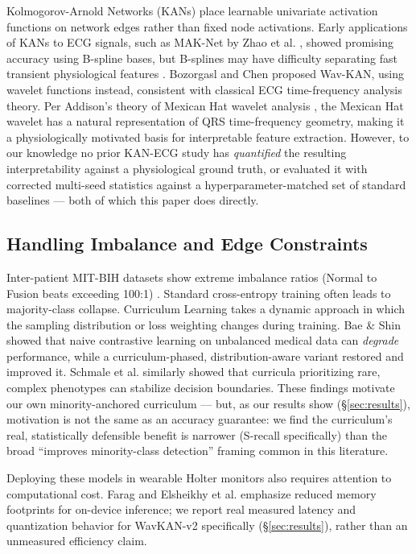 \documentclass[journal,twoside,web]{ieeecolor}
\begin{document}
Kolmogorov-Arnold Networks (KANs) \cite{liu_kan_2024} place learnable univariate activation functions on network edges rather than fixed node activations. Early applications of KANs to ECG signals, such as MAK-Net by Zhao et al. \cite{zhao_mak-net_2025}, showed promising accuracy using B-spline bases, but B-splines may have difficulty separating fast transient physiological features \cite{bozorgasl_liu_2024}. Bozorgasl and Chen \cite{bozorgasl_liu_2024} proposed Wav-KAN, using wavelet functions instead, consistent with classical ECG time-frequency analysis theory. Per Addison's theory of Mexican Hat wavelet analysis \cite{addison_wavelet_2005}, the Mexican Hat wavelet has a natural representation of QRS time-frequency geometry, making it a physiologically motivated basis for interpretable feature extraction. However, to our knowledge no prior KAN-ECG study has \emph{quantified} the resulting interpretability against a physiological ground truth, or evaluated it with corrected multi-seed statistics against a hyperparameter-matched set of standard baselines --- both of which this paper does directly.

\subsection{Handling Imbalance and Edge Constraints}
Inter-patient MIT-BIH datasets show extreme imbalance ratios (Normal to Fusion beats exceeding 100:1) \cite{silva_systematic_2025}. Standard cross-entropy training often leads to majority-class collapse. Curriculum Learning \cite{bengio_curriculum_2009} takes a dynamic approach in which the sampling distribution or loss weighting changes during training. Bae \& Shin \cite{bae_handling_2025} showed that naive contrastive learning on unbalanced medical data can \emph{degrade} performance, while a curriculum-phased, distribution-aware variant restored and improved it. Schmale et al. \cite{schmale_curriculum_2025} similarly showed that curricula prioritizing rare, complex phenotypes can stabilize decision boundaries. These findings motivate our own minority-anchored curriculum --- but, as our results show (\S\ref{sec:results}), motivation is not the same as an accuracy guarantee: we find the curriculum's real, statistically defensible benefit is narrower (S-recall specifically) than the broad ``improves minority-class detection'' framing common in this literature.

Deploying these models in wearable Holter monitors also requires attention to computational cost. Farag \cite{farag_tiny_2023} and Elsheikhy et al. \cite{elsheikhy_lightweight_2025} emphasize reduced memory footprints for on-device inference; we report real measured latency and quantization behavior for WavKAN-v2 specifically (\S\ref{sec:results}), rather than an unmeasured efficiency claim.
\end{document}
